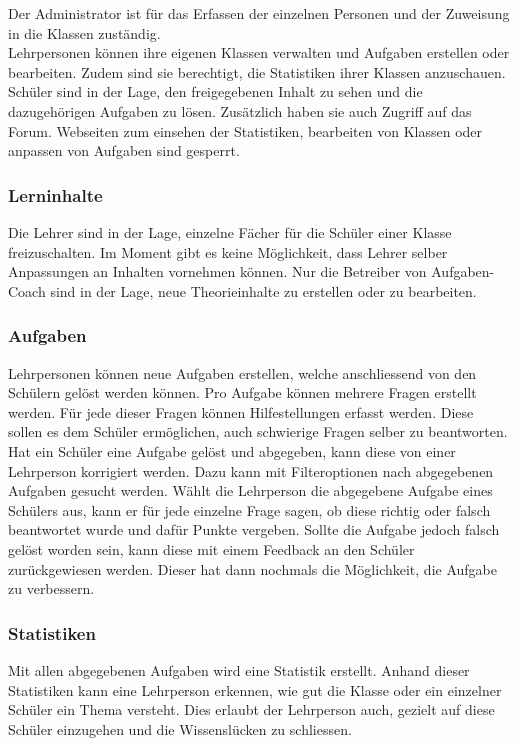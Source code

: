 Der Administrator ist für das Erfassen der einzelnen Personen und der Zuweisung in die Klassen zuständig. \\

Lehrpersonen können ihre eigenen Klassen verwalten und Aufgaben erstellen oder bearbeiten. Zudem sind sie berechtigt, die Statistiken ihrer Klassen anzuschauen. \\

Schüler sind in der Lage, den freigegebenen Inhalt zu sehen und die dazugehörigen Aufgaben zu lösen. Zusätzlich haben sie auch Zugriff auf das Forum. Webseiten zum einsehen der Statistiken, bearbeiten von Klassen oder anpassen von Aufgaben sind gesperrt.

\subsubsection*{Lerninhalte}
Die Lehrer sind in der Lage, einzelne Fächer für die Schüler einer Klasse freizuschalten. Im Moment gibt es keine Möglichkeit, dass Lehrer selber Anpassungen an Inhalten vornehmen können. Nur die Betreiber von Aufgaben-Coach sind in der Lage, neue Theorieinhalte zu erstellen oder zu bearbeiten.

\subsubsection*{Aufgaben}
Lehrpersonen können neue Aufgaben erstellen, welche anschliessend von den Schülern gelöst werden können. Pro Aufgabe können mehrere Fragen erstellt werden. Für jede dieser Fragen können Hilfestellungen erfasst werden. Diese sollen es dem Schüler ermöglichen, auch schwierige Fragen selber zu beantworten. \\

Hat ein Schüler eine Aufgabe gelöst und abgegeben, kann diese von einer Lehrperson korrigiert werden. Dazu kann mit Filteroptionen nach abgegebenen Aufgaben gesucht werden. Wählt die Lehrperson die abgegebene Aufgabe eines Schülers aus, kann er für jede einzelne Frage sagen, ob diese richtig oder falsch beantwortet wurde und dafür Punkte vergeben. Sollte die Aufgabe jedoch falsch gelöst worden sein, kann diese mit einem Feedback an den Schüler zurückgewiesen werden. Dieser hat dann nochmals die Möglichkeit, die Aufgabe zu verbessern. 

\subsubsection*{Statistiken}
Mit allen abgegebenen Aufgaben wird eine Statistik erstellt. Anhand dieser Statistiken kann eine Lehrperson erkennen, wie gut die Klasse oder ein einzelner Schüler ein Thema versteht. Dies erlaubt der Lehrperson auch, gezielt auf diese Schüler einzugehen und die Wissenslücken zu schliessen.

